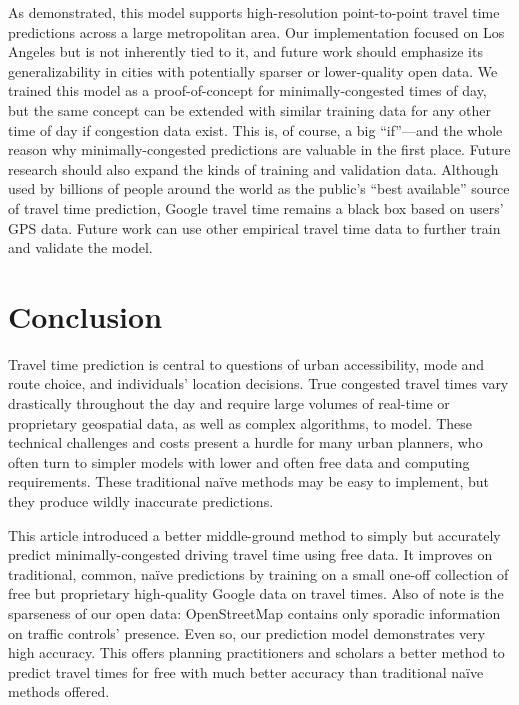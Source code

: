 \documentclass[12pt,letterpaper]{article} %
\begin{document}
As demonstrated, this model supports high-resolution point-to-point travel time predictions across a large metropolitan area. Our implementation focused on Los Angeles but is not inherently tied to it, and future work should emphasize its generalizability in cities with potentially sparser or lower-quality open data. We trained this model as a proof-of-concept for minimally-congested times of day, but the same concept can be extended with similar training data for any other time of day if congestion data exist. This is, of course, a big \enquote{if}---and the whole reason why minimally-congested predictions are valuable in the first place. Future research should also expand the kinds of training and validation data. Although used by billions of people around the world as the public's \enquote{best available} source of travel time prediction, Google travel time remains a black box based on users' GPS data. Future work can use other empirical travel time data to further train and validate the model.

\section{Conclusion}

Travel time prediction is central to questions of urban accessibility, mode and route choice, and individuals' location decisions. True congested travel times vary drastically throughout the day and require large volumes of real-time or proprietary geospatial data, as well as complex algorithms, to model. These technical challenges and costs present a hurdle for many urban planners, who often turn to simpler models with lower and often free data and computing requirements. These traditional naïve methods may be easy to implement, but they produce wildly inaccurate predictions.

This article introduced a better middle-ground method to simply but accurately predict minimally-congested driving travel time using free data. It improves on traditional, common, naïve predictions by training on a small one-off collection of free but proprietary high-quality Google data on travel times. Also of note is the sparseness of our open data: OpenStreetMap contains only sporadic information on traffic controls' presence. Even so, our prediction model demonstrates very high accuracy. This offers planning practitioners and scholars a better method to predict travel times for free with much better accuracy than traditional naïve methods offered.
\end{document}
